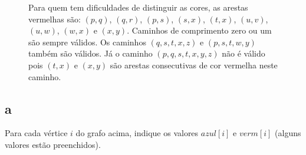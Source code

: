 \begin{figure}[H]
    \centering
    

    \caption{Para quem tem dificuldades de distinguir as cores, as arestas vermelhas são: $(p, q)$, $(q, r)$, $(p, s)$, $(s, x)$, $(t, x)$, $(u, v)$, $(u, w)$, $(w, x)$ e $(x, y)$. Caminhos de comprimento zero ou um são sempre válidos. Os caminhos $(q, s, t, x, z)$ e $(p, s, t, w, y)$ também são válidos. Já o caminho $(p, q, s, t, x, y, z)$ não é válido pois $(t, x)$ e $(x, y)$ são arestas consecutivas de cor vermelha neste caminho.}
\end{figure}

\subsection{a} Para cada vértice $i$ do grafo acima, indique os valores $azul[i]$ e $verm[i]$ (alguns valores estão preenchidos).

\itemdsep[0.25]
